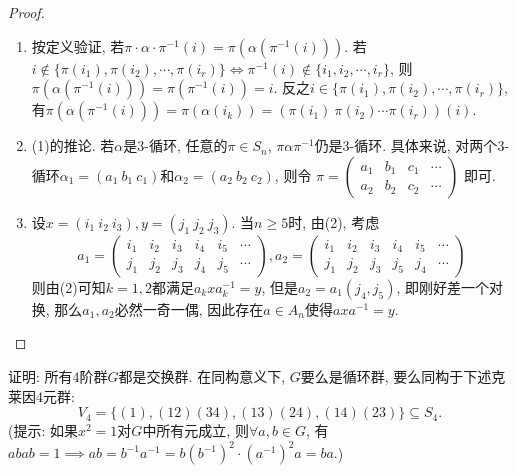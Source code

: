 \documentclass{../solutions-cn}
\begin{document}
\begin{proof}
    \begin{enumerate}[(1)]
        \item 按定义验证, 若$\pi \cdot \alpha \cdot \pi^{-1}(i) = \pi(\alpha(\pi^{-1}(i)))$. 若$i \notin \{\pi(i_1), \pi(i_2), \cdots, \pi(i_r)\} \iff \pi^{-1}(i) \notin \{i_1, i_2, \cdots, i_r\}$, 则$\pi(\alpha(\pi^{-1}(i))) = \pi(\pi^{-1}(i)) = i$. 反之$i \in \{\pi(i_1), \pi(i_2), \cdots, \pi(i_r)\}$, 有$\pi(\alpha(\pi^{-1}(i))) = \pi(\alpha(i_k)) = (\pi(i_1)\:\pi(i_2) \cdots \pi(i_r))(i)$.
        \item (1)的推论. 若$\alpha$是$3$-循环, 任意的$\pi \in S_n$, $\pi\alpha\pi^{-1}$仍是$3$-循环. 具体来说, 对两个$3$-循环$\alpha_1 = (a_1\:b_1\:c_1)$和$\alpha_2 = (a_2\:b_2\:c_2)$, 则令
        \(
            \pi = 
            \begin{pmatrix} 
                a_1 & b_1 & c_1 & \cdots \\
                a_2 & b_2 & c_2 & \cdots 
            \end{pmatrix}
        \) 
        即可.
        \item 设$x = (i_1\:i_2\:i_3), y = (j_1\:j_2\:j_3)$. 当$n \geqslant 5$时, 由(2), 考虑
        \[
            a_1 =
            \begin{pmatrix} 
                i_1 & i_2 & i_3 & i_4 & i_5 & \cdots \\
                j_1 & j_2 & j_3 & j_4 & j_5 & \cdots 
            \end{pmatrix},
            a_2 =
            \begin{pmatrix} 
                i_1 & i_2 & i_3 & i_4 & i_5 & \cdots \\
                j_1 & j_2 & j_3 & j_5 & j_4 & \cdots 
            \end{pmatrix}
        \]
        则由(2)可知$k = 1, 2$都满足$a_kxa_k^{-1} = y$, 但是$a_2 = a_1(j_4, j_5)$, 即刚好差一个对换, 那么$a_1, a_2$必然一奇一偶, 因此存在$a \in A_n$使得$axa^{-1} = y$.
    \end{enumerate}
\end{proof}

\begin{exercise}[习题4.2.7]
    证明: 所有$4$阶群$G$都是交换群. 在同构意义下, $G$要么是循环群, 要么同构于下述克莱因$4$元群: 
    \[
        V_4 = \{(1), (12)(34), (13)(24), (14)(23)\} \subseteq S_4.
    \]
    (提示: 如果$x^2 = 1$对$G$中所有元成立, 则$\forall a, b \in G$, 有$abab = 1 \implies ab = b^{-1}a^{-1} = b(b^{-1})^2 \cdot (a^{-1})^2a = ba.$)
\end{exercise}
\end{document}
